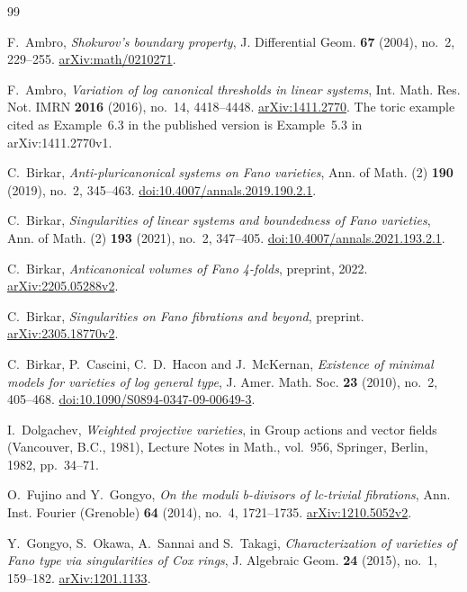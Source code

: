 \documentclass[11pt,reqno]{amsart}
\numberwithin{equation}{section}
\theoremstyle{definition}
\theoremstyle{remark}
\begin{document}
\begin{thebibliography}{99}

F.~Ambro, \emph{Shokurov's boundary property}, J. Differential Geom. \textbf{67} (2004), no.~2, 229--255.
\href{https://arxiv.org/abs/math/0210271}{arXiv:math/0210271}.

F.~Ambro, \emph{Variation of log canonical thresholds in linear systems}, Int. Math. Res. Not. IMRN \textbf{2016} (2016), no.~14, 4418--4448.
\href{https://arxiv.org/abs/1411.2770}{arXiv:1411.2770}. The toric example cited as Example~6.3 in the published version is Example~5.3 in arXiv:1411.2770v1.

C.~Birkar, \emph{Anti-pluricanonical systems on Fano varieties}, Ann. of Math. (2) \textbf{190} (2019), no.~2, 345--463.
\href{https://doi.org/10.4007/annals.2019.190.2.1}{doi:10.4007/annals.2019.190.2.1}.

C.~Birkar, \emph{Singularities of linear systems and boundedness of Fano varieties}, Ann. of Math. (2) \textbf{193} (2021), no.~2, 347--405.
\href{https://doi.org/10.4007/annals.2021.193.2.1}{doi:10.4007/annals.2021.193.2.1}.

C.~Birkar, \emph{Anticanonical volumes of Fano 4-folds}, preprint, 2022.
\href{https://arxiv.org/abs/2205.05288v2}{arXiv:2205.05288v2}.

C.~Birkar, \emph{Singularities on Fano fibrations and beyond}, preprint.
\href{https://arxiv.org/abs/2305.18770v2}{arXiv:2305.18770v2}.

C.~Birkar, P.~Cascini, C.~D.~Hacon and J.~McKernan, \emph{Existence of minimal models for varieties of log general type}, J. Amer. Math. Soc. \textbf{23} (2010), no.~2, 405--468.
\href{https://doi.org/10.1090/S0894-0347-09-00649-3}{doi:10.1090/S0894-0347-09-00649-3}.

I.~Dolgachev, \emph{Weighted projective varieties}, in Group actions and vector fields (Vancouver, B.C., 1981), Lecture Notes in Math., vol.~956, Springer, Berlin, 1982, pp.~34--71.

O.~Fujino and Y.~Gongyo, \emph{On the moduli b-divisors of lc-trivial fibrations}, Ann. Inst. Fourier (Grenoble) \textbf{64} (2014), no.~4, 1721--1735.
\href{https://arxiv.org/abs/1210.5052v2}{arXiv:1210.5052v2}.

Y.~Gongyo, S.~Okawa, A.~Sannai and S.~Takagi, \emph{Characterization of varieties of Fano type via singularities of Cox rings}, J. Algebraic Geom. \textbf{24} (2015), no.~1, 159--182.
\href{https://arxiv.org/abs/1201.1133}{arXiv:1201.1133}.


\end{thebibliography}
\end{document}
